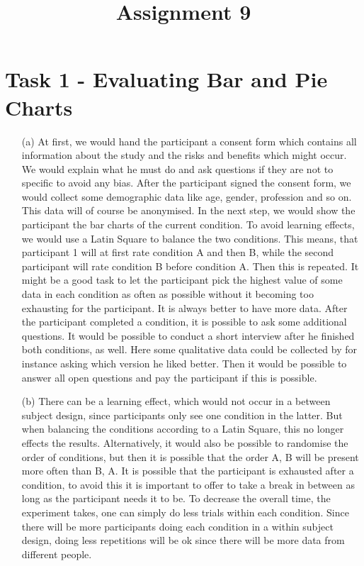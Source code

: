 \documentclass[a4paper]{article}
\date{}
\author{}
\title{\textbf{Assignment 9}}
\begin{document}
\maketitle 
\thispagestyle{fancy}


\section*{Task 1 - Evaluating Bar and Pie Charts}

\begin{enumerate}
	\item[(a)]  
	At first, we would hand the participant a consent form which contains all information about the study and the risks and benefits which might occur. 
	We would explain what he must do and ask questions if they are not to specific to avoid any bias. 
	After the participant signed the consent form, we would collect some demographic data like age, gender, profession and so on. 
	This data will of course be anonymised. 
	In the next step, we would show the participant the bar charts of the current condition. 
	To avoid learning effects, we would use a Latin Square to balance the two conditions. 
	This means, that participant 1 will at first rate condition A and then B, while the second participant will rate condition B before condition A. 
	Then this is repeated.
	It might be a good task to let the participant pick the highest value of some data in each condition as often as possible without it becoming too exhausting for the participant. 
	It is always better to have more data. 
	After the participant completed a condition, it is possible to ask some additional questions. 
	It would be possible to conduct a short interview after he finished both conditions, as well. 
	Here some qualitative data could be collected by for instance asking which version he liked better. 
	Then it would be possible to answer all open questions and pay the participant if this is possible.  
	\item[(b)] There can be a learning effect, which would not occur in a between subject design, since participants only see one condition in the latter. 
	But when balancing the conditions according to a Latin Square, this no longer effects the results. 
	Alternatively, it would also be possible to randomise the order of conditions, but then it is possible that the order A, B will be present more often than B, A. 
	It is possible that the participant is exhausted after a condition, to avoid this it is important to offer to take a break in between as long as the participant needs it to be. 
	To decrease the overall time, the experiment takes, one can simply do less trials within each condition. 
	Since there will be more participants doing each condition in a within subject design, doing less repetitions will be ok since there will be more data from different people. 
\end{enumerate}
\end{document}
